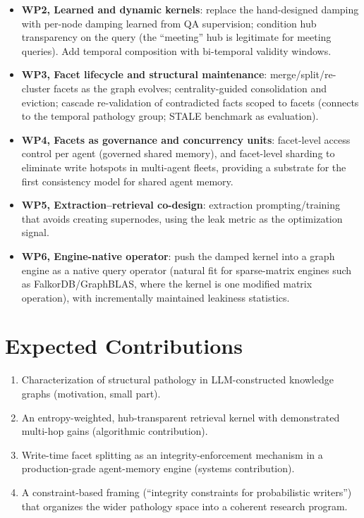 \documentclass[11pt,a4paper]{article}
\begin{document}
\begin{itemize}[nosep]
  \item \textbf{WP2, Learned and dynamic kernels}: replace the hand-designed damping with per-node damping learned from QA supervision; condition hub transparency on the query (the ``meeting'' hub is legitimate for meeting queries). Add temporal composition with bi-temporal validity windows.
  \item \textbf{WP3, Facet lifecycle and structural maintenance}: merge/split/re-cluster facets as the graph evolves; centrality-guided consolidation and eviction; cascade re-validation of contradicted facts scoped to facets (connects to the temporal pathology group; STALE benchmark as evaluation).
  \item \textbf{WP4, Facets as governance and concurrency units}: facet-level access control per agent (governed shared memory), and facet-level sharding to eliminate write hotspots in multi-agent fleets, providing a substrate for the first consistency model for shared agent memory.
  \item \textbf{WP5, Extraction--retrieval co-design}: extraction prompting/training that avoids creating supernodes, using the leak metric as the optimization signal.
  \item \textbf{WP6, Engine-native operator}: push the damped kernel into a graph engine as a native query operator (natural fit for sparse-matrix engines such as FalkorDB/GraphBLAS, where the kernel is one modified matrix operation), with incrementally maintained leakiness statistics.
\end{itemize}

\section{Expected Contributions}

\begin{enumerate}[nosep]
  \item Characterization of structural pathology in LLM-constructed knowledge graphs (motivation, small part).
  \item An entropy-weighted, hub-transparent retrieval kernel with demonstrated multi-hop gains (algorithmic contribution).
  \item Write-time facet splitting as an integrity-enforcement mechanism in a production-grade agent-memory engine (systems contribution).
  \item A constraint-based framing (``integrity constraints for probabilistic writers'') that organizes the wider pathology space into a coherent research program.
\end{enumerate}
\end{document}
